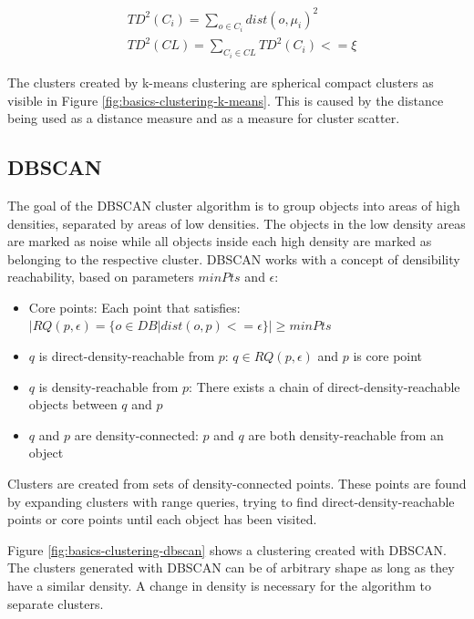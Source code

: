 \documentclass[pdftex,12pt,a4paper]{report}
\begin{document}
\begin{equation}
\begin{split}
& TD^2(C_i) = \sum\limits_{o \in C_i} dist(o, \mu_i)^2  \\
& TD^2(CL) = \sum\limits_{C_i \in CL} TD^2(C_i) <= \xi
\end{split}
\end{equation}

The clusters created by k-means clustering are spherical compact clusters as visible in Figure \ref{fig:basics-clustering-k-means}. This is caused by the distance being used as a distance measure and as a measure for cluster scatter.

\subsection{DBSCAN}

The goal of the DBSCAN cluster algorithm is to group objects into areas of high densities, separated by areas of low densities. The objects in the low density areas are marked as noise while all objects inside each high density are marked as belonging to the respective cluster. DBSCAN works with a concept of densibility reachability, based on parameters $minPts$ and $\epsilon$:

\begin{itemize}
	\item
	Core points: Each point that satisfies: \\$|RQ(p, \epsilon) = \{  o \in DB | dist(o,p) <= \epsilon  \}| \geq minPts$
	
	 \item
	 $q$ is direct-density-reachable from $p$: $q \in RQ(p, \epsilon)$ and $p$ is core point
	 
	 \item
	 $q$ is density-reachable from $p$: There exists a chain of direct-density-reachable objects between $q$ and $p$
	 
	 \item
	 $q$ and $p$ are density-connected: $p$ and $q$ are both density-reachable from an object
\end{itemize}

Clusters are created from sets of density-connected points. These points are found by expanding clusters with range queries, trying to find direct-density-reachable points or core points until each object has been visited.

Figure \ref{fig:basics-clustering-dbscan} shows a clustering created with DBSCAN. The clusters generated with DBSCAN can be of arbitrary shape as long as they have a similar density. A change in density is necessary for the algorithm to separate clusters. 
\end{document}
